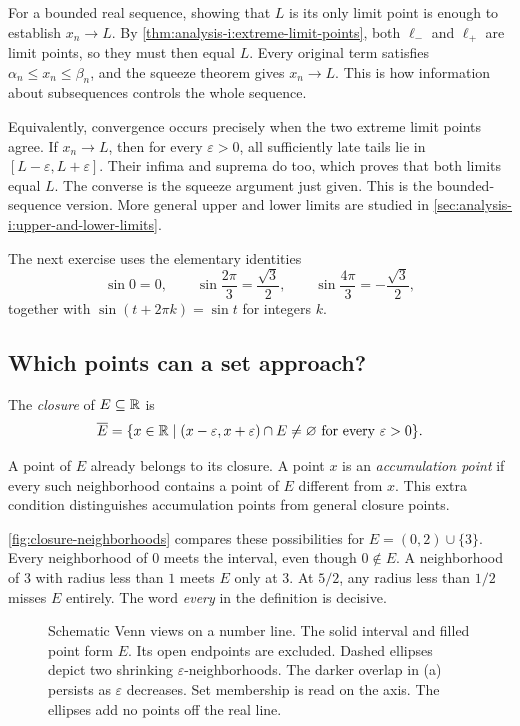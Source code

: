 For a bounded real sequence, showing that $L$ is its only limit point
is enough to establish $x_n\to L$. By
\autoref{thm:analysis-i:extreme-limit-points}, both $\ell_-$ and $\ell_+$
are limit points, so they must then equal $L$. Every original term
satisfies $\alpha_n\leq x_n\leq\beta_n$, and the squeeze theorem gives
$x_n\to L$. This is how information about subsequences controls the
whole sequence.

Equivalently, convergence occurs precisely when the two extreme limit
points agree.
If $x_n\to L$, then for every $\varepsilon>0$, all sufficiently late tails
lie in $[L-\varepsilon,L+\varepsilon]$. Their infima and suprema do too,
which proves that both limits equal $L$. The converse is the squeeze
argument just given.
This is the bounded-sequence version. More general upper and lower limits
are studied in \autoref{sec:analysis-i:upper-and-lower-limits}.

The next exercise uses the elementary identities
\[
  \sin0=0,\qquad \sin\frac{2\pi}{3}=\frac{\sqrt3}{2},\qquad
  \sin\frac{4\pi}{3}=-\frac{\sqrt3}{2},
\]
together with $\sin(t+2\pi k)=\sin t$ for integers $k$.



\subsection{Which points can a set approach?}
\begin{definition}
  The \emph{closure} of $E\subseteq\mathbb{R}$ is
  \[
    \overline E=\{x\in\mathbb{R}\mid (x-\varepsilon,x+\varepsilon)\cap E
      \ne\varnothing\text{ for every }\varepsilon>0\}.
  \]
\end{definition}
A point of $E$ already belongs to its closure. A point $x$ is an
\emph{accumulation point} if every such neighborhood contains a point of
$E$ different from $x$. This extra condition distinguishes accumulation
points from general closure points.

\autoref{fig:closure-neighborhoods} compares these possibilities for
$E=(0,2)\cup\{3\}$. Every neighborhood of $0$ meets the interval, even
though $0\notin E$. A neighborhood of $3$ with radius less than $1$
meets $E$ only at $3$. At $5/2$, any radius less than $1/2$ misses $E$
entirely. The word \emph{every} in the definition is decisive.
\begin{figure}[htbp]
  \centering
  
  \caption[Closure and shrinking neighborhoods.]{Schematic Venn views on
    a number line. The solid interval and filled point form $E$. Its open
    endpoints are excluded. Dashed ellipses depict two shrinking
    $\varepsilon$-neighborhoods. The darker overlap in (a) persists as
    $\varepsilon$ decreases. Set membership is read on the axis. The
    ellipses add no points off the real line.}
  \label{fig:closure-neighborhoods}
\end{figure}

